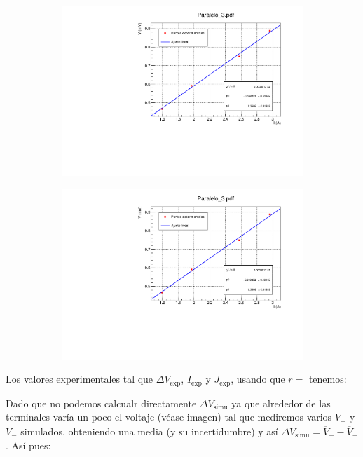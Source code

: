 \documentclass[11pt]{article}
\newcommand{\simu}{\text{simu}}
\begin{document}
\begin{figure}[h!]\centering
\begin{subfigure}[b]{0.49\textwidth}
	\includegraphics[width=1.05\linewidth]{Programas/Paralelo_3.pdf}
\end{subfigure} \hfill
\begin{subfigure}[b]{0.49\textwidth}
	\includegraphics[width=1.05\linewidth]{Programas/Paralelo_3.pdf}
\end{subfigure}
\end{figure}


Los valores experimentales tal que $\Delta V_{\exp}$, $I_{\exp}$ y $J_{\exp}$, usando que $r=$ tenemos: 



Dado que no podemos calcualr directamente $\Delta V_{\simu}$ ya que alrededor de las terminales varía un poco el voltaje (véase imagen) tal que mediremos varios $V_+$ y $V_-$ simulados, obteniendo una media (y su incertidumbre) y así $\Delta V_{\simu} = \overline{V}_+ - \overline{V}_{-} $. Así pues: \\[1em]
\end{document}

